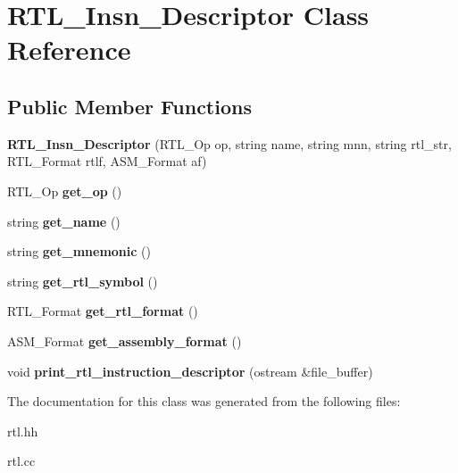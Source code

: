\hypertarget{classRTL__Insn__Descriptor}{}\section{R\+T\+L\+\_\+\+Insn\+\_\+\+Descriptor Class Reference}
\label{classRTL__Insn__Descriptor}
\subsection*{Public Member Functions}
\begin{DoxyCompactItemize}
\item 
\mbox{\label{classRTL__Insn__Descriptor_a149715cfe716c94751433f5ce5e6e0cc}} 
{\bfseries R\+T\+L\+\_\+\+Insn\+\_\+\+Descriptor} (R\+T\+L\+\_\+\+Op op, string name, string mnn, string rtl\+\_\+str, R\+T\+L\+\_\+\+Format rtlf, A\+S\+M\+\_\+\+Format af)
\item 
\mbox{\label{classRTL__Insn__Descriptor_ac1b432c9583a8f7bb9f07d46c0500d08}} 
R\+T\+L\+\_\+\+Op {\bfseries get\+\_\+op} ()
\item 
\mbox{\label{classRTL__Insn__Descriptor_ab4358f4ed12c396e67d8b3ddf15cad1a}} 
string {\bfseries get\+\_\+name} ()
\item 
\mbox{\label{classRTL__Insn__Descriptor_a3a57509c8e655b8ea3e279b40eac9ffc}} 
string {\bfseries get\+\_\+mnemonic} ()
\item 
\mbox{\label{classRTL__Insn__Descriptor_a5b2a9280ba60f0304c8f5810f470841c}} 
string {\bfseries get\+\_\+rtl\+\_\+symbol} ()
\item 
\mbox{\label{classRTL__Insn__Descriptor_a896a155138f58ad308b8fa45051c643b}} 
R\+T\+L\+\_\+\+Format {\bfseries get\+\_\+rtl\+\_\+format} ()
\item 
\mbox{\label{classRTL__Insn__Descriptor_a02a0e2a571e9d07edb5f741e24aaa610}} 
A\+S\+M\+\_\+\+Format {\bfseries get\+\_\+assembly\+\_\+format} ()
\item 
\mbox{\label{classRTL__Insn__Descriptor_a4f66a884df4898aba026542fad00450e}} 
void {\bfseries print\+\_\+rtl\+\_\+instruction\+\_\+descriptor} (ostream \&file\+\_\+buffer)
\end{DoxyCompactItemize}


The documentation for this class was generated from the following files\+:\begin{DoxyCompactItemize}
\item 
rtl.\+hh\item 
rtl.\+cc\end{DoxyCompactItemize}
